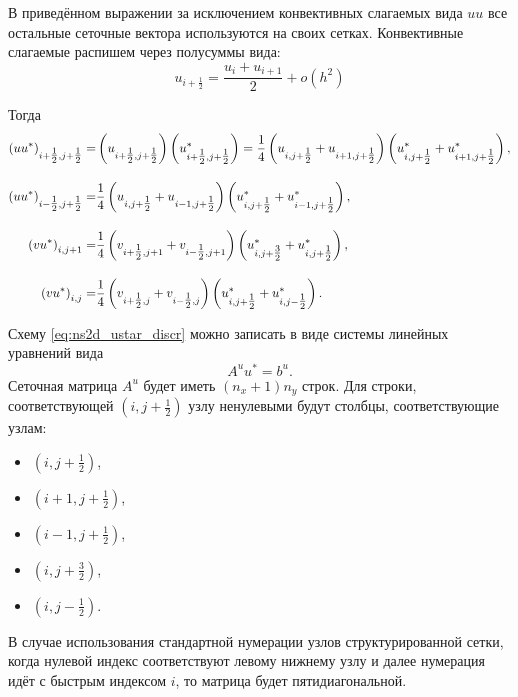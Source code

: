 В приведённом выражении
за исключением конвективных слагаемых вида $u u$ все остальные
сеточные вектора используются на своих сетках.
Конвективные слагаемые распишем через полусуммы вида:
\begin{equation*}
    u_{i+\tfrac12} = \frac{u_{i} + u_{i+1}}{2} + o(h^2)
\end{equation*}

Тогда
\begin{align*}
    \left(u u^*\right)_{i+\tfrac12,j+\tfrac12} =&
        \left(u_{i+\tfrac12,j+\tfrac12} \vphantom{u^*_{\tfrac12}}\right)\left(u^*_{i+\tfrac12,j+\tfrac12}\right) =
        \frac14 \left(u_{i, j+\tfrac12} + u_{i+1,j+\tfrac12}\vphantom{u^*_{\tfrac12}}\right)
                \left(u^*_{i, j+\tfrac12} + u^*_{i+1,j+\tfrac12}\right), \\[10pt]
    \left(u u^*\right)_{i-\tfrac12,j+\tfrac12} =&
        \frac14 \left(u_{i, j+\tfrac12} + u_{i-1,j+\tfrac12}\vphantom{u^*_{\tfrac12}}\right)
                \left(u^*_{i, j+\tfrac12} + u^*_{i-1,j+\tfrac12}\right), \\[10pt]
    \left(v u^*\right)_{i,j+1} =&
        \frac14 \left(v_{i+\tfrac12, j+1} + v_{i-\tfrac12,j+1}\vphantom{u^*_{\tfrac12}}\right)
                \left(u^*_{i, j+\tfrac32} + u^*_{i,j+\tfrac12}\right), \\[10pt]
    \left(v u^*\right)_{i,j} =&
        \frac14 \left(v_{i+\tfrac12, j} + v_{i-\tfrac12,j}\vphantom{u^*_{\tfrac12}}\right)
                \left(u^*_{i, j+\tfrac12} + u^*_{i,j-\tfrac12}\right).
\end{align*}

Схему \eqref{eq:ns2d_ustar_discr} можно записать в виде системы линейных уравнений вида
\begin{equation}
    \label{eq:ns2d_ustar_slae}
    A^u u^* = b^{u}.
\end{equation}
Сеточная матрица $A^u$ будет иметь $(n_x+1)n_y$ строк.
Для строки, соответствующей $\left(i,j+\tfrac12\right)$ узлу ненулевыми будут столбцы,
соответствующие узлам:
\begin{itemize}
\item $\left(i,j+\tfrac12\right)$,
\item $\left(i+1,j+\tfrac12\right)$,
\item $\left(i-1,j+\tfrac12\right)$,
\item $\left(i,j+\tfrac32\right)$,
\item $\left(i,j-\tfrac12\right)$.
\end{itemize}

В случае использования стандартной нумерации узлов структурированной сетки,
когда нулевой индекс соответствуют левому нижнему узлу и далее нумерация идёт
с быстрым индексом $i$, то матрица будет пятидиагональной.


